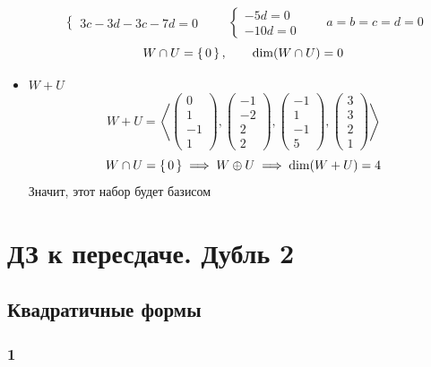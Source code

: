 \begin{itemize}
$$\begin{cases}
        3c - 3d - 3c - 7d = 0
    \end{cases} \qquad
    \begin{cases}
    	-5d = 0 \\
        -10d = 0
    \end{cases} \qquad a = b = c = d = 0 $$
    $$ W \cap U = \set{0}, \qquad \dim(W \cap U) = 0 $$
    \item $ W + U $
    $$ W + U = \left\langle
    \begin{pmatrix}
    	0 \\
        1 \\
        -1 \\
        1
    \end{pmatrix},
    \begin{pmatrix}
    	-1 \\
        -2 \\
        2 \\
        2
    \end{pmatrix},
    \begin{pmatrix}
    	-1 \\
        1 \\
        -1 \\
        5
    \end{pmatrix},
    \begin{pmatrix}
    	3 \\
        3 \\
        2 \\
        1
    \end{pmatrix} \right\rangle $$
    $$ W \cap U = \set{0} \implies W \oplus U \implies \dim(W + U) = 4 $$
    Значит, этот набор будет базисом
\end{itemize}

\section{ДЗ к пересдаче. Дубль 2}

\subsection{Квадратичные формы}

\subsubsection{1}

